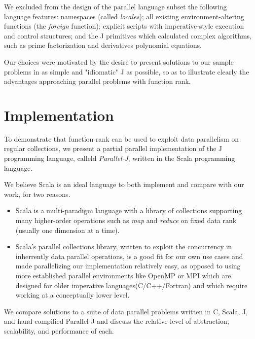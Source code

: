 We excluded from the design of the parallel language subset the following language features: 
namespaces (called \textit{locales});
all existing environment-altering functions (the \textit{foreign} function);
explicit scripts with imperative-style execution and control structures;
and the J primitives which calculated complex algorithms, such as prime factorization and derivatives polynomial equations.

Our choices were motivated by the desire to present solutions to our sample problems in as simple and "idiomatic" J as possible, 
so as to illustrate clearly the advantages approaching parallel problems with function rank.


\section{Implementation}
\label{imp}
To demonstrate that function rank can be used to exploit data parallelism on regular collections, we present a partial parallel implementation of the J programming language, calleld \textit{Parallel-J}, written in the Scala programming language.\begin{comment}TODO cite?\end{comment}
We believe Scala is an ideal language to both implement and compare with our work, for two reasons.
\begin{itemize}
    \item Scala is a multi-paradigm language with a library of collections supporting many higher-order operations such as \textit{map} and \textit{reduce} on fixed data rank (usually one dimension at a time). %
    \item Scala's parallel collections library\cite{pc}, written to exploit the concurrency in inherrently data parallel operations, is a good fit for our own use cases and made parallelizing our implementation relatively easy, as opposed to using more established parallel environments like OpenMP or MPI which are designed for older imperative languages(C/C++/Fortran) and which require working at a conceptually lower level.
\end{itemize}
We compare solutions to a suite of data parallel problems written in C, Scala, J, and hand-compilied Parallel-J %
and discuss the relative level of abstraction, scalability, and performance of each.

